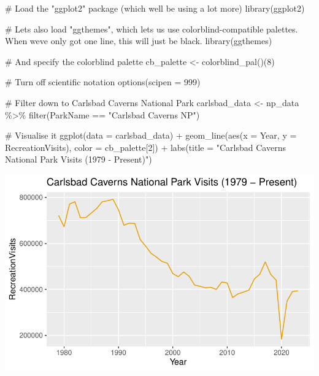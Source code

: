 \documentclass[
  letterpaper,
  DIV=11,
  numbers=noendperiod]{scrartcl}
\newenvironment{Shaded}{\begin{snugshade}}{\end{snugshade}}
\newcommand{\AttributeTok}[1]{\textcolor[rgb]{0.40,0.45,0.13}{#1}}
\newcommand{\CommentTok}[1]{\textcolor[rgb]{0.37,0.37,0.37}{#1}}
\newcommand{\DecValTok}[1]{\textcolor[rgb]{0.68,0.00,0.00}{#1}}
\newcommand{\FunctionTok}[1]{\textcolor[rgb]{0.28,0.35,0.67}{#1}}
\newcommand{\NormalTok}[1]{\textcolor[rgb]{0.00,0.23,0.31}{#1}}
\newcommand{\OtherTok}[1]{\textcolor[rgb]{0.00,0.23,0.31}{#1}}
\newcommand{\SpecialCharTok}[1]{\textcolor[rgb]{0.37,0.37,0.37}{#1}}
\newcommand{\StringTok}[1]{\textcolor[rgb]{0.13,0.47,0.30}{#1}}
\begin{document}
\begin{Shaded}
\begin{Highlighting}[]
\CommentTok{\# Load the "ggplot2" package (which we\textquotesingle{}ll be using a lot more)}
\FunctionTok{library}\NormalTok{(ggplot2)}

\CommentTok{\# Let\textquotesingle{}s also load "ggthemes", which let\textquotesingle{}s us use colorblind{-}compatible palettes. When we\textquotesingle{}ve only got one line, this will just be black.}
\FunctionTok{library}\NormalTok{(ggthemes)}

\CommentTok{\# And specify the colorblind palette}
\NormalTok{cb\_palette }\OtherTok{\textless{}{-}} \FunctionTok{colorblind\_pal}\NormalTok{()(}\DecValTok{8}\NormalTok{)}

\CommentTok{\# Turn off scientific notation}
\FunctionTok{options}\NormalTok{(}\AttributeTok{scipen =} \DecValTok{999}\NormalTok{)}

\CommentTok{\# Filter down to Carlsbad Caverns National Park}
\NormalTok{carlsbad\_data }\OtherTok{\textless{}{-}}\NormalTok{ np\_data }\SpecialCharTok{\%\textgreater{}\%} \FunctionTok{filter}\NormalTok{(ParkName }\SpecialCharTok{==} \StringTok{"Carlsbad Caverns NP"}\NormalTok{)}

\CommentTok{\# Visualise it}
\FunctionTok{ggplot}\NormalTok{(}\AttributeTok{data =}\NormalTok{ carlsbad\_data) }\SpecialCharTok{+} 
  \FunctionTok{geom\_line}\NormalTok{(}\FunctionTok{aes}\NormalTok{(}\AttributeTok{x =}\NormalTok{ Year, }\AttributeTok{y =}\NormalTok{ RecreationVisits), }\AttributeTok{color =}\NormalTok{ cb\_palette[}\DecValTok{2}\NormalTok{]) }\SpecialCharTok{+} 
  \FunctionTok{labs}\NormalTok{(}\AttributeTok{title =} \StringTok{"Carlsbad Caverns National Park Visits (1979 {-} Present)"}\NormalTok{)}
\end{Highlighting}
\end{Shaded}

\includegraphics{data-essay_files/figure-pdf/unnamed-chunk-7-1.pdf}
\end{document}
